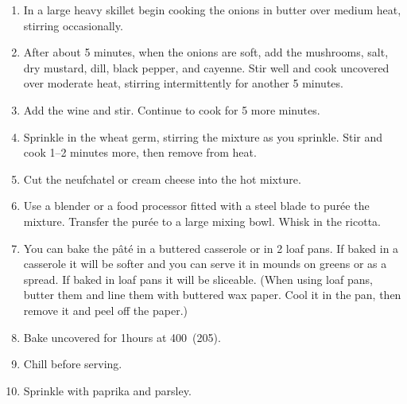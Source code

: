 
\begin{ingredients}
\end{ingredients}


\begin{recipe}
  \begin{enumerate}

  \item In a large heavy skillet begin cooking the onions in butter over medium heat, stirring occasionally.

  \item After about 5 minutes, when the onions are soft, add the
  mushrooms, salt, dry mustard, dill, black pepper, and cayenne.  Stir
  well and cook uncovered over moderate heat, stirring intermittently
  for another 5 minutes.

\item Add the wine and stir.  Continue to cook for 5 more minutes.

\item Sprinkle in the wheat germ, stirring the mixture as you
  sprinkle.  Stir and cook 1--2 minutes more, then remove from heat.

\item Cut the neufchatel or cream cheese into the hot mixture.

\item Use a blender or a food processor fitted with a steel blade to
  pur\'ee the mixture.  Transfer the pur\'ee to a large mixing bowl.
  Whisk in the ricotta.

\item You can bake the p\^at\'e in a buttered casserole or in 2 loaf
  pans.  If baked in a casserole it will be softer and you can serve
  it in mounds on greens or as a spread.  If baked in loaf pans it
  will be sliceable.  (When using loaf pans, butter them and line them
  with buttered wax paper.  Cool it in the pan, then remove it and
  peel off the paper.)

\item Bake uncovered for 1\fracQ hours at 400\F\ (205\C).

\item Chill before serving.

\item Sprinkle with paprika and parsley.

  \end{enumerate}
\end{recipe}

